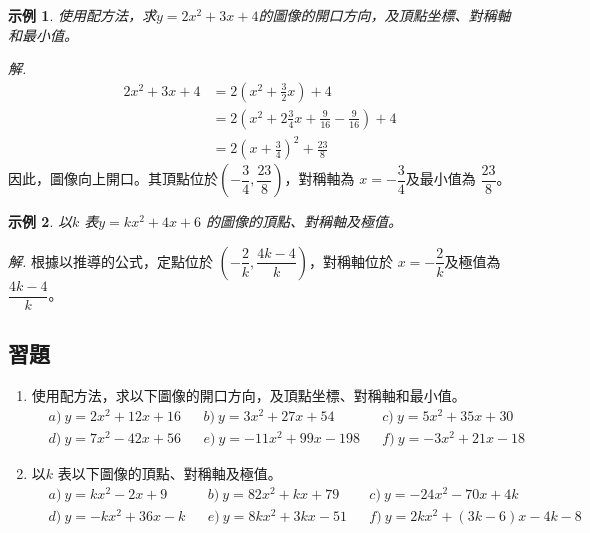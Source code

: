 \documentclass[12pt]{article}
\newtheorem{example}{示例}
\begin{document}
    \begin{example}
        使用配方法，求$y=2x^2+3x+4$的圖像的開口方向，及頂點坐標、對稱軸和最小值。
    \end{example}

    \textit{ 解.}\begin{align*}
        2x^2+3x+4&=2(x^2+\frac{3}{2}x)+4\\
        &=2(x^2+2\frac{3}{4}x+\frac{9}{16}-\frac{9}{16})+4\\
        &=2(x+\frac{3}{4})^2+\frac{23}{8}
    \end{align*}
    因此，圖像向上開口。其頂點位於$(-\dfrac{3}{4},\dfrac{23}{8})$，對稱軸為 $x=-\dfrac{3}{4}$及最小值為 $\dfrac{23}{8}$。

    \begin{example}
        以$k$ 表$y=kx^2+4x+6$ 的圖像的頂點、對稱軸及極值。
    \end{example}

    \textit{ 解.}
    根據以推導的公式，定點位於 $(-\dfrac{2}{k},\dfrac{4k-4}{k})$，對稱軸位於 $x=-\dfrac{2}{k}$及極值為 $\dfrac{4k-4}{k}$。

    \subsection*{習題}
    \begin{enumerate}
        \item 使用配方法，求以下圖像的開口方向，及頂點坐標、對稱軸和最小值。\begin{align*}
            &a)\ y=2x^2+12x+16&&b)\ y=3x^2+27x+54&&c)\ y=5x^2+35x+30\\
            &d)\ y=7x^2-42x+56&&e)\ y=-11x^2+99x-198&&f)\ y=-3x^2+21x-18
        \end{align*}
        \item 以$k$ 表以下圖像的頂點、對稱軸及極值。\begin{align*}
            &a)\ y=kx^2-2x+9&&b)\ y=82x^2+kx+79&&c)\ y=-24x^2-70x+4k\\
            &d)\ y=-kx^2+36x-k&&e)\ y=8kx^2+3kx-51&&f)\ y=2kx^2+(3k-6)x-4k-8
        \end{align*}
    \end{enumerate}

    \pagebreak
\end{document}
